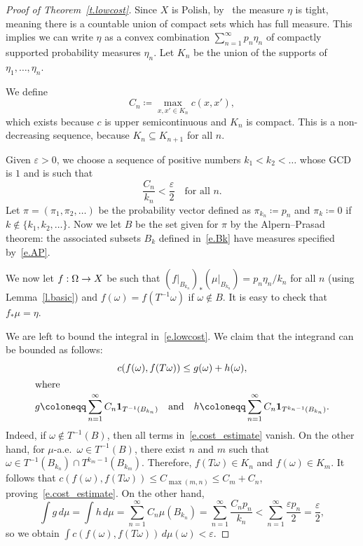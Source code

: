 \documentclass[AHL,Unicode,longabstracts,published]{cedram}
\newcommand{\bfun}{\mathbf{1}}
\renewcommand{\epsilon}{\varepsilon}
\renewcommand*{\to}{\mathchoice{\longrightarrow}{\rightarrow}{\rightarrow}{\rightarrow}}
\begin{document}
\begin{proof}[Proof of Theorem~\ref{t.lowcost}]
Since $X$ is Polish, by~\cite[p.~8, Theorem~1.3]{billingsley} the measure $\eta$ is tight, meaning there is a countable union of compact sets which has full measure. This implies we can write $\eta$ as a convex combination $\sum_{n=1}^\infty p_n \eta_n$ of compactly supported probability measures $\eta_n$. Let $K_n$ be the union of the supports of $\eta_1,\dots,\eta_n$.

We define
\begin{equation}
C_n \coloneqq \max_{x,x' \in K_n}c(x,x'),
\end{equation}
which exists because $c$ is upper semicontinuous and $K_n$ is compact. This is a non-decreasing sequence, because $K_n \subseteq K_{n+1}$ for all $n$.

Given $\epsilon > 0$, we choose a sequence of positive numbers $k_1 < k_2 < \dots$ whose GCD is $1$ and is such that
\begin{equation}\label{e.stoppedtimes}
\frac{C_n}{k_n} < \frac{\epsilon}{2} \quad \text{for all $n$.}
\end{equation}
Let $\pi = (\pi_1,\pi_2,\dots)$ be the probability vector defined as $\pi_{k_n} \coloneqq p_n$ and $\pi_k \coloneqq 0$ if $k \notin \{ k_1,k_2,\dots\}$. Now we let $B$ be the set given for $\pi$ by the Alpern--Prasad theorem: the associated subsets $B_k$ defined in~\eqref{e.Bk} have measures specified by~\eqref{e.AP}.

We now let $f:\Omega \to X$ be such that $(f|_{B_{k_n}})_{*}(\mu|_{B_{k_n}}) = p_n\eta_n/k_n$ for all $n$ (using Lemma~\ref{l.basic}) and $f(\omega) = f(T^{-1}\omega)$ if $\omega \notin B$. It is easy to check that $f_*\mu = \eta$.

We are left to bound the integral in~\eqref{e.lowcost}. We claim that the integrand can be bounded as follows:
\begin{gather}\label{e.cost_estimate}
c(f(\omega), f(T\omega)) \le g(\omega) + h(\omega),\\
\intertext{where}
g \coloneqq \sum_{n=1}^\infty C_n \bfun_{T^{-1}(B_{k_n})} \quad \text{and} \quad h \coloneqq \sum_{n=1}^\infty C_n \bfun_{T^{k_n-1}(B_{k_n})}.
\end{gather}
Indeed, if $\omega \not\in T^{-1}(B)$, then all terms in~\eqref{e.cost_estimate} vanish. On the other hand, for $\mu$-a.e.\ $\omega \in T^{-1}(B)$, there exist $n$ and $m$ such that $\omega \in T^{-1}(B_{k_n}) \cap T^{k_m-1}(B_{k_m})$. Therefore, $f(T\omega) \in K_n$ and $f(\omega)\in K_m$. It follows that $c(f(\omega), f(T\omega)) \le C_{\max(m,n)} \le C_m + C_n$, proving~\eqref{e.cost_estimate}. On the other hand,
\begin{equation}
\int g \, d\mu = \int h \, d\mu = \sum_{n=1}^\infty C_n \mu(B_{k_n}) = \sum_{n=1}^\infty \frac{C_n p_n}{k_n} < \sum_{n=1}^\infty \frac{\epsilon p_n}{2} = \frac{\epsilon}{2},
\end{equation}
so we obtain $\int c(f(\omega), f(T\omega)) \, d\mu(\omega)<\epsilon$.
\end{proof}
\end{document}
